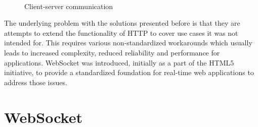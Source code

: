 \\
\begin{figure}[h!]
	\centering
	 \hfill
	\caption{Client-server communication}
\end{figure}

\noindent
The underlying problem with the solutions presented before is that they are attempts to extend the functionality of HTTP to cover use cases it was not intended for. This requires various non-standardized workarounds which usually leads to increased complexity, reduced reliability and performance for applications. WebSocket was introduced, initially as a part of the HTML5 initiative, to provide a standardized foundation for real-time web applications to address those issues.

\section{WebSocket}

